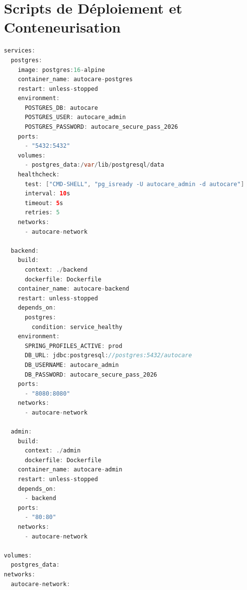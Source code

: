 \documentclass[12pt,a4paper,oneside]{report}
\begin{document}
\chapter{Scripts de D\'eploiement et Conteneurisation}
\label{anx:devops}

\begin{lstlisting}[language=Java, caption={Fichier docker-compose.yml d'orchestration de la plateforme}]
services:
  postgres:
    image: postgres:16-alpine
    container_name: autocare-postgres
    restart: unless-stopped
    environment:
      POSTGRES_DB: autocare
      POSTGRES_USER: autocare_admin
      POSTGRES_PASSWORD: autocare_secure_pass_2026
    ports:
      - "5432:5432"
    volumes:
      - postgres_data:/var/lib/postgresql/data
    healthcheck:
      test: ["CMD-SHELL", "pg_isready -U autocare_admin -d autocare"]
      interval: 10s
      timeout: 5s
      retries: 5
    networks:
      - autocare-network

  backend:
    build:
      context: ./backend
      dockerfile: Dockerfile
    container_name: autocare-backend
    restart: unless-stopped
    depends_on:
      postgres:
        condition: service_healthy
    environment:
      SPRING_PROFILES_ACTIVE: prod
      DB_URL: jdbc:postgresql://postgres:5432/autocare
      DB_USERNAME: autocare_admin
      DB_PASSWORD: autocare_secure_pass_2026
    ports:
      - "8080:8080"
    networks:
      - autocare-network

  admin:
    build:
      context: ./admin
      dockerfile: Dockerfile
    container_name: autocare-admin
    restart: unless-stopped
    depends_on:
      - backend
    ports:
      - "80:80"
    networks:
      - autocare-network

volumes:
  postgres_data:
networks:
  autocare-network:
\end{lstlisting}
\end{document}
